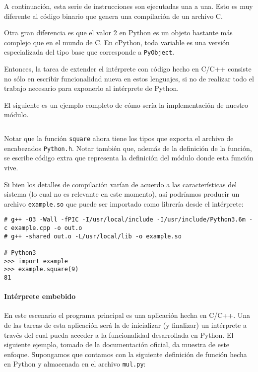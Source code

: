 A continuación, esta serie de instrucciones son ejecutadas una a una. Esto es
muy diferente al código binario que genera una compilación de un archivo C.

Otra gran diferencia es que el valor 2 en Python es un objeto bastante más
complejo que en el mundo de C. En cPython, toda variable es una versión
especializada del tipo base que corresponde a \verb!PyObject!.

Entonces, la tarea de extender el intérprete con código hecho en C/C++ consiste
no sólo en escribir funcionalidad nueva en estos lenguajes, si no de realizar
todo el trabajo necesario para exponerlo al intérprete de Python.

El siguiente es un ejemplo completo de cómo sería la implementación de nuestro módulo. 

\inputminted{c}{codelistings/module.c}

Notar que la función \verb!square! ahora tiene los tipos que exporta el archivo
de encabezados \verb!Python.h!. Notar también que, además de la definición de
la función, se escribe código extra que representa la definición del módulo
donde esta función vive.

Si bien los detalles de compilación varían de acuerdo a las características del
sistema (lo cual no es relevante en este momento), así podríamos producir un
archivo \verb!example.so! que puede ser importado como librería desde el
intérprete:

\begin{verbatim}
# g++ -O3 -Wall -fPIC -I/usr/local/include -I/usr/include/Python3.6m -c example.cpp -o out.o
# g++ -shared out.o -L/usr/local/lib -o example.so

# Python3
>>> import example
>>> example.square(9)
81
\end{verbatim}

\paragraph{Intérprete embebido}

En este escenario el programa principal es una aplicación hecha en C/C++. Una
de las tareas de esta aplicación será la de inicializar (y finalizar) un
intérprete a través del cual pueda acceder a la funcionalidad desarrollada en
Python. El siguiente ejemplo, tomado de la documentación oficial, da muestra de
este enfoque. Supongamos que contamos con la siguiente definición de función
hecha en Python y almacenada en el archivo \verb!mul.py!:

